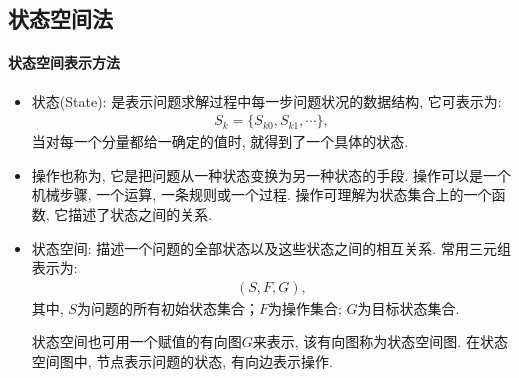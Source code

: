 \subsection{状态空间法}
\paragraph{状态空间表示方法}
\begin{itemize}
\item 状态(State): 是表示问题求解过程中每一步问题状况的数据结构, 它可表示为:
\begin{align}
    S_k=\{S_{k0}, S_{k1}, \cdots\},
\end{align}
当对每一个分量都给一确定的值时, 就得到了一个具体的状态.

\item 操作也称为, 它是把问题从一种状态变换为另一种状态的手段.
操作可以是一个机械步骤, 一个运算, 一条规则或一个过程. 操作可理解为状态集合上的一个函数, 它描述了状态之间的关系.

\item 状态空间: 描述一个问题的全部状态以及这些状态之间的相互关系. 常用三元组表示为:
\begin{align}
  (S, F, G),
\end{align}
其中, $S$为问题的所有初始状态集合；$F$为操作集合; $G$为目标状态集合.

\begin{remark}
    状态空间也可用一个赋值的有向图$G$来表示, 该有向图称为状态空间图. 在状态空间图中, 节点表示问题的状态, 有向边表示操作.
\end{remark}
\end{itemize}
